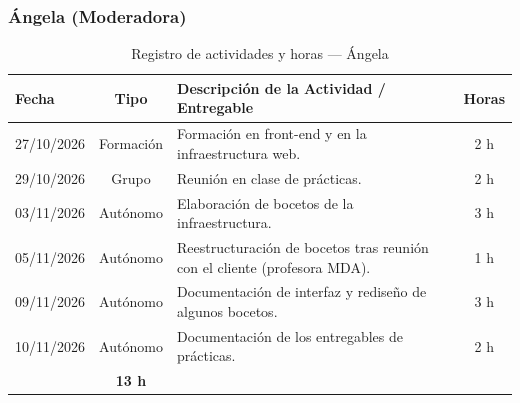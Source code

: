 \subsubsection{Ángela (Moderadora)}
\begin{table}[H]
\centering
\small
{}
\begin{tabularx}{\textwidth}{l c X c}
\toprule
\rowcolor{verdeApagado}
\textbf{\color{textoOscuro}Fecha} & \textbf{\color{textoOscuro}Tipo} & \textbf{\color{textoOscuro}Descripción de la Actividad / Entregable} & \textbf{\color{textoOscuro}Horas} \\
\midrule
27/10/2026 & Formación & Formación en front-end y en la infraestructura web. & 2 h \\
29/10/2026 & Grupo & Reunión en clase de prácticas. & 2 h \\
03/11/2026 & Autónomo & Elaboración de bocetos de la infraestructura. & 3 h \\
05/11/2026 & Autónomo & Reestructuración de bocetos tras reunión con el cliente (profesora MDA). & 1 h \\
09/11/2026 & Autónomo & Documentación de interfaz y rediseño de algunos bocetos. & 3 h \\
10/11/2026 & Autónomo & Documentación de los entregables de prácticas. & 2 h \\
\midrule
\rowcolor{azulclaro!60}
\multicolumn{3}{l}{\textbf{\color{textoOscuro}Total Horas Dedicadas — Ángela:}} & \textbf{\color{textoOscuro}13 h} \\
\bottomrule
\end{tabularx}
\caption{Registro de actividades y horas — Ángela}
\end{table}


